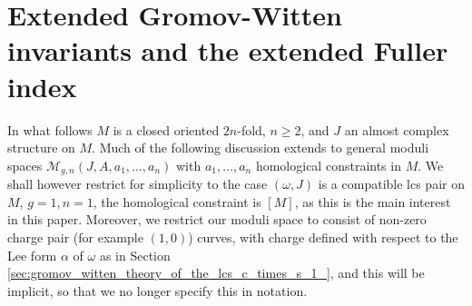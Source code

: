 \documentclass{amsart}
\numberwithin{equation}{section}
\theoremstyle{definition}
\theoremstyle{remark}
\begin{document}
\section {Extended Gromov-Witten invariants and the extended Fuller index} 
In what follows $M$ is a closed oriented $2n$-fold, $n \geq 2$, and $J$ an almost complex structure on $M$. Much of the following discussion extends to general moduli spaces $\mathcal{M} _{g,n} (J,A, a_1, \ldots, a _{n} ) $ with $a _{1}, \ldots, a _{n}  $ homological constraints in $M$. 
We shall however restrict for simplicity to the case $(\omega,J)$ is a compatible lcs pair on $M$, $g=1, n=1$, the homological constraint is $[M]$, as this is the main interest in this paper. Moreover, we restrict our moduli space to consist of non-zero charge pair (for example $(1,0)$) curves, with charge defined with respect to the Lee form $\alpha$ of $\omega$ as in Section \ref{sec:gromov_witten_theory_of_the_lcs_c_times_s_1_}, and this will be implicit, so that we no longer specify this in notation.
\end{document}
